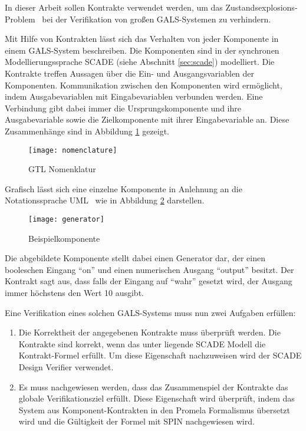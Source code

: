 In dieser Arbeit sollen Kontrakte verwendet werden, um das Zu\-stands\-ex\-plo\-sions-Pro\-blem~\cite{state_explosion} bei der Verifikation von großen GALS-Systemen zu verhindern.

Mit Hilfe von Kontrakten lässt sich das Verhalten von jeder Komponente in einem GALS-System beschreiben.
Die Komponenten sind in der synchronen Modellierungssprache SCADE (siehe Abschnitt \ref{sec:scade}) modelliert.
Die Kontrakte treffen Aussagen über die Ein- und Ausgangsvariablen der Komponenten.
Kommunikation zwischen den Komponenten wird ermöglicht, indem Ausgabevariablen mit Eingabevariablen verbunden werden.
Eine Verbindung gibt dabei immer die Ursprungskomponente und ihre Ausgabevariable sowie die Zielkomponente mit ihrer Eingabevariable an.
Diese Zusammenhänge sind in Abbildung \ref{fig:nomenclature} gezeigt.
\begin{figure}
  \centering
  \texttt{[image: nomenclature]}
  \caption{GTL Nomenklatur}
  \label{fig:nomenclature}
\end{figure}

Grafisch lässt sich eine einzelne Komponente in Anlehnung an die Notationssprache UML~\cite{uml} wie in Abbildung \ref{fig:example_generator} darstellen.
\begin{figure}
  \centering
  \texttt{[image: generator]}
  \caption{Beispielkomponente}
  \label{fig:example_generator}
\end{figure}
Die abgebildete Komponente stellt dabei einen Generator dar, der einen booleschen Eingang "`on"' und einen numerischen Ausgang "`output"' besitzt.
Der Kontrakt sagt aus, dass falls der Eingang auf "`wahr"' gesetzt wird, der Ausgang immer höchstens den Wert 10 ausgibt.

Eine Verifikation eines solchen GALS-Systems muss nun zwei Aufgaben erfüllen:
\begin{enumerate}
\item Die Korrektheit der angegebenen Kontrakte muss überprüft werden.
  Die Kontrakte sind korrekt, wenn das unter liegende SCADE Modell die Kontrakt-Formel erfüllt.
  Um diese Eigenschaft nachzuweisen wird der SCADE Design Verifier verwendet.
\item Es muss nachgewiesen werden, dass das Zusammenspiel der Kontrakte das globale Verifikationsziel erfüllt.
  Diese Eigenschaft wird überprüft, indem das System aus Komponent-Kontrakten in den Promela Formalismus übersetzt wird und die Gültigkeit der Formel mit SPIN nachgewiesen wird.
\end{enumerate}

